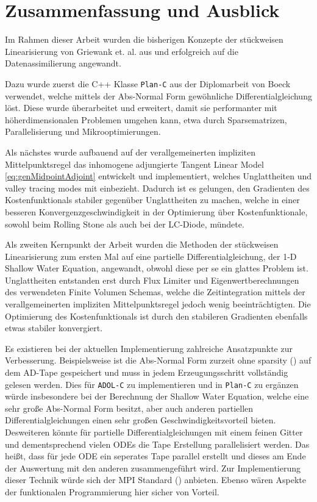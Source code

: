 \chapter{Zusammenfassung und Ausblick}

Im Rahmen dieser Arbeit wurden die bisherigen Konzepte der stückweisen Linearisierung von Griewank et. al. aus \cite{monster} und \cite{plan} erfolgreich auf die Datenassimilierung angewandt.

Dazu wurde zuerst die C++ Klasse \texttt{Plan-C} aus der Diplomarbeit von Boeck \cite{boeck14} verwendet, welche mittels der Abs-Normal Form gewöhnliche Differentialgleichung löst. Diese wurde überarbeitet und erweitert, damit sie performanter mit höherdimensionalen Problemen umgehen kann, etwa durch Sparsematrizen, Parallelisierung und Mikrooptimierungen. 

Als nächstes wurde aufbauend auf der verallgemeinerten impliziten Mittelpunktsregel das inhomogene adjungierte Tangent Linear Model \eqref{eq:genMidpointAdjoint} entwickelt und implementiert, welches Unglattheiten und valley tracing modes mit einbezieht. Dadurch ist es gelungen, den Gradienten des Kostenfunktionals stabiler gegenüber Unglattheiten zu machen, welche in einer besseren Konvergenzgeschwindigkeit in der Optimierung über Kostenfunktionale, sowohl beim Rolling Stone als auch bei der LC-Diode, mündete.

Als zweiten Kernpunkt der Arbeit wurden die Methoden der stückweisen Linearisierung zum ersten Mal auf eine partielle Differentialgleichung, der 1-D Shallow Water Equation, angewandt, obwohl diese per se ein glattes Problem ist. Unglattheiten entstanden erst durch Flux Limiter und Eigenwertberechnungen des verwendeten Finite Volumen Schemas, welche die Zeitintegration mittels der verallgemeinerten impliziten Mittelpunktsregel jedoch wenig beeinträchtigten.
Die Optimierung des Kostenfunktionals ist durch den stabileren Gradienten ebenfalls etwas stabiler konvergiert.

Es existieren bei der aktuellen Implementierung zahlreiche Ansatzpunkte zur Verbesserung. Beispielsweise ist die Abs-Normal Form zurzeit ohne sparsity (\cite[S.137 ff.]{griewank2008evaluating}) auf dem AD-Tape gespeichert und muss in jedem Erzeugungsschritt vollständig gelesen werden. Dies für \texttt{ADOL-C} zu implementieren und in \texttt{Plan-C} zu ergänzen  würde insbesondere bei der Berechnung der Shallow Water Equation, welche eine sehr große Abs-Normal Form besitzt, aber auch anderen partiellen Differentialgleichungen einen sehr großen Geschwindigkeitsvorteil bieten. 
Desweiteren könnte für partielle Differentialgleichungen mit einem feinen Gitter und dementsprechend vielen ODEs die Tape Erstellung parallelisiert werden. Das heißt, dass für jede ODE ein seperates Tape parallel erstellt und dieses am Ende der Auswertung mit den anderen zusammengeführt wird. Zur Implementierung dieser Technik würde sich der MPI Standard (\cite{mpi}) anbieten. Ebenso wären Aspekte der funktionalen Programmierung hier sicher von Vorteil.

